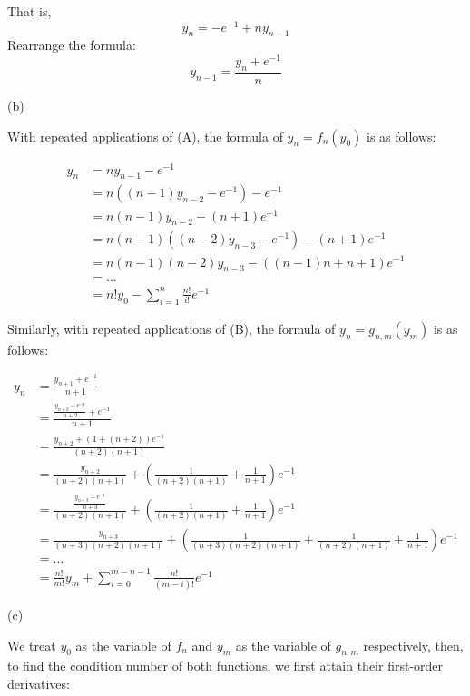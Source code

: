 \documentclass[12pt]{article}
\begin{document}
That is,
\begin{equation*}
y_n = -e^{-1}+ny_{n-1}\tag{A}
\end{equation*}
Rearrange the formula:
\begin{equation*}
y_{n-1} = \frac{y_n+e^{-1}}{n}\tag{B}
\end{equation*}

(b)

With repeated applications of (A),  the formula of $y_n = f_n(y_0)$ is as follows:

\begin{equation*}
\begin{split}
y_n &= ny_{n-1} - e^{-1} \\
&= n((n-1)y_{n-2}-e^{-1})-e^{-1}\\
&= n(n-1)y_{n-2} - (n+1) e^{-1}\\
&= n(n-1)((n-2)y_{n-3}-e^{-1}) - (n+1) e^{-1}\\
&= n(n-1)(n-2)y_{n-3} - ((n-1)n + n + 1)e^{-1}\\
&= ...\\
&= n!y_0 - \sum_{i = 1}^n \frac{n!}{i!}e^{-1}
\end{split}
\end{equation*}

Similarly, with repeated applications of (B), the formula of $y_n = g_{n,m}(y_m)$ is as follows:

\begin{equation*}
\begin{split}
y_n &= \frac{y_{n+1}+e^{-1}}{n+1}\\
&= \frac{\frac{y_{n+2}+e^{-1}}{n+2}+e^{-1}}{n+1}\\
&= \frac{y_{n+2}+(1+(n+2))e^{-1}}{(n+2)(n+1)}\\
&= \frac{y_{n+2}}{(n+2)(n+1)}+(\frac{1}{(n+2)(n+1)}+\frac{1}{n+1})e^{-1}\\
&= \frac{\frac{y_{n+3}+e^{-1}}{n+3}}{(n+2)(n+1)} + (\frac{1}{(n+2)(n+1)}+\frac{1}{n+1})e^{-1}\\
&= \frac{y_{n+3}}{(n+3)(n+2)(n+1)}+(\frac{1}{(n+3)(n+2)(n+1)}+\frac{1}{(n+2)(n+1)}+\frac{1}{n+1})e^{-1}\\
&= ...\\
&= \frac{n!}{m!}y_m + \sum_{i = 0}^{m-n-1}\frac{n!}{(m-i)!}e^{-1}
\end{split}
\end{equation*}

(c)

We treat $y_0$ as the variable of $f_n$ and $y_m$ as the variable of $g_{n,m}$ respectively, then, to find the condition number of both functions, we first attain their first-order derivatives:
\end{document}
